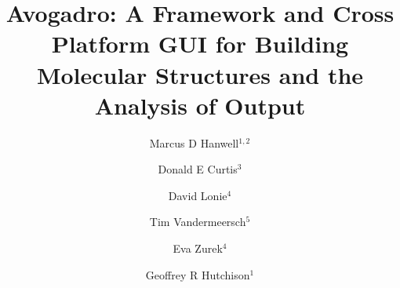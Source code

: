 \documentclass[10pt]{bmc_article}
\newenvironment{bmcformat}{\begin{raggedright}
\baselineskip20pt\sloppy\setboolean{publ}{false}}{\end{raggedright}
\baselineskip20pt\sloppy}
\begin{document}
\begin{bmcformat}



\title{Avogadro: A Framework and Cross Platform GUI for Building Molecular
  Structures and the Analysis of Output}

\author{Marcus D Hanwell\correspondingauthor$^{1, 2}$%
  \and
  Donald E Curtis$^3$%
  \and
  David Lonie$^4$%
  \and
  Tim Vandermeersch$^5$%
  \and
  Eva Zurek$^4$%
  \and
  Geoffrey R Hutchison$^1$%
  }


\address{%
  \iid(1)Department of Chemistry, University of Pittsburgh, 219 Parkman Avenue,
Pittsburgh, PA, 15260, USA\\
  \iid(2)Kitware, Inc., 28 Corporate Drive, Clifton Park, NY, 12065, USA\\
  \iid(3)Department of Computer Science, University of Iowa\\
  \iid(4)Department of Chemistry, State University of New York at Buffalo\\
  \iid(5)Tim's Affiliation, Europe
}%

\maketitle



\end{bmcformat}
\end{document}
